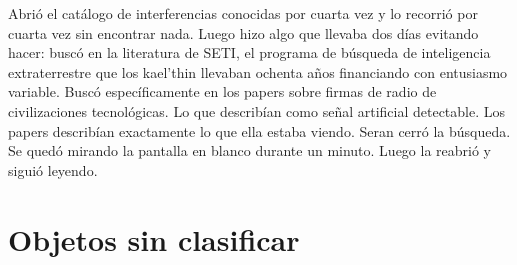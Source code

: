 \documentclass[11pt,a5paper,twoside]{book}
\begin{document}
Abrió el catálogo de interferencias conocidas por cuarta vez y lo recorrió por cuarta vez sin encontrar nada.
Luego hizo algo que llevaba dos días evitando hacer: buscó en la literatura de SETI, el programa de búsqueda de inteligencia extraterrestre que los kael'thin llevaban ochenta años financiando con entusiasmo variable. Buscó específicamente en los papers sobre firmas de radio de civilizaciones tecnológicas. Lo que describían como señal artificial detectable.
Los papers describían exactamente lo que ella estaba viendo.
Seran cerró la búsqueda. Se quedó mirando la pantalla en blanco durante un minuto.
Luego la reabrió y siguió leyendo.

\chapter{Objetos sin clasificar}
\end{document}
